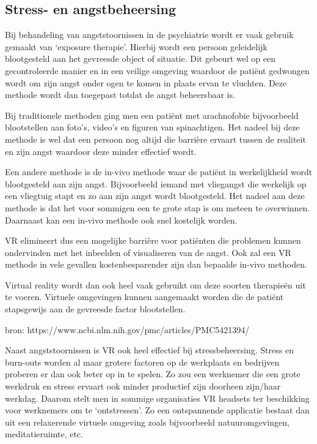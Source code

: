 \subsection{Stress- en angstbeheersing}  
Bij behandeling van angststoornissen in de psychiatrie wordt er vaak gebruik gemaakt van ‘exposure therapie’. Hierbij wordt een persoon geleidelijk blootgesteld aan het gevreesde object of situatie. Dit gebeurt wel op een gecontroleerde manier en in een veilige omgeving waardoor de patiënt gedwongen wordt om zijn angst onder ogen te komen in plaats ervan te vluchten. Deze methode wordt dan toegepast totdat de angst beheersbaar is. 

Bij traditionele methoden ging men een patiënt met arachnofobie bijvoorbeeld blootstellen aan foto’s, video’s en figuren van spinachtigen. Het nadeel bij deze methode is wel dat een persoon nog altijd die barrière ervaart tussen de realiteit en zijn angst waardoor deze minder effectief wordt.

Een andere methode is de in-vivo methode waar de patiënt in werkelijkheid wordt blootgesteld aan zijn angst. Bijvoorbeeld iemand met vliegangst die werkelijk op een vliegtuig stapt en zo aan zijn angst wordt blootgesteld. Het nadeel aan deze methode is dat het voor sommigen een te grote stap is om meteen te overwinnen. Daarnaast kan een in-vivo methode ook snel kostelijk worden.

VR elimineert dus een mogelijke barrière voor patiënten die problemen kunnen ondervinden met het inbeelden of visualiseren van de angst. Ook zal een VR methode in vele gevallen kostenbesparender zijn dan bepaalde in-vivo methoden.

Virtual reality wordt dan ook heel vaak gebruikt om deze soorten therapieën uit te voeren. Virtuele omgevingen kunnen aangemaakt worden die de patiënt stapsgewijs aan de gevreesde factor blootstellen.

bron: https://www.ncbi.nlm.nih.gov/pmc/articles/PMC5421394/

Naast angststoornissen is VR ook heel effectief bij stressbeheersing. Stress en burn-outs worden al maar grotere factoren op de werkplaats en bedrijven proberen er dan ook beter op in te spelen. Zo zou een werknemer die een grote werkdruk en stress ervaart ook minder productief zijn doorheen zijn/haar werkdag. Daarom stelt men in sommige organisaties VR headsets ter beschikking voor werknemers om te ‘ontstressen’.  
Zo een ontspannende applicatie bestaat dan uit een relaxerende virtuele omgeving zoals bijvoorbeeld natuuromgevingen, meditatieruimte, etc.

